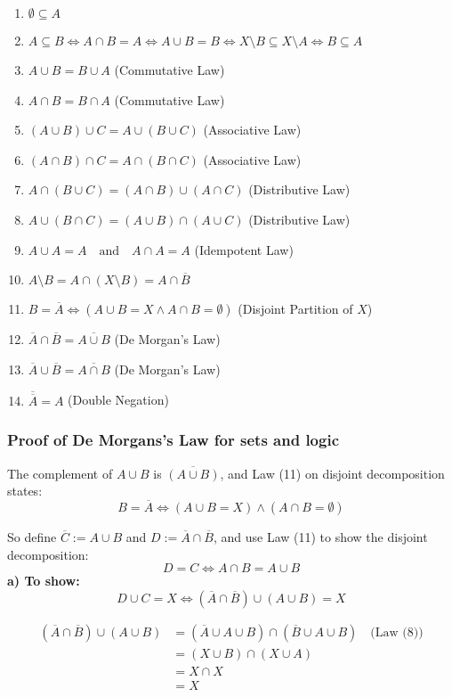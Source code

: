 \begin{enumerate}
    \item $\emptyset \subseteq A$
    \item $A \subseteq B \iff A \cap B = A \iff A \cup B = B \iff X \setminus B \subseteq X \setminus A \iff B \subseteq A$
    \item $A \cup B = B \cup A$ \hfill (Commutative Law)
    \item $A \cap B = B \cap A$ \hfill (Commutative Law)
    \item $(A \cup B) \cup C = A \cup (B \cup C)$ \hfill (Associative Law)
    \item $(A \cap B) \cap C = A \cap (B \cap C)$ \hfill (Associative Law)
    \item $A \cap (B \cup C) = (A \cap B) \cup (A \cap C)$ \hfill (Distributive Law)
    \item $A \cup (B \cap C) = (A \cup B) \cap (A \cup C)$ \hfill (Distributive Law)
    \item $A \cup A = A \quad \text{and} \quad A \cap A = A$ \hfill (Idempotent Law)
    \item $A \setminus B = A \cap (X \setminus B) = A \cap \overline{B}$
    \item $B = \overline{A} \iff (A \cup B = X \land A \cap B = \emptyset)$ \hfill (Disjoint Partition of $X$)
    \item $\overline{A} \cap \overline{B} = \overline{A \cup B}$ \hfill (De Morgan's Law)
    \item $\overline{A} \cup \overline{B} = \overline{A \cap B}$ \hfill (De Morgan's Law)
    \item $\overline{\overline{A}} = A$ \hfill (Double Negation)
\end{enumerate}

\subsubsection{Proof of De Morgans's Law for sets and logic}
The complement of \( A \cup B \) is \( \overline{(A \cup B)} \), and Law (11) on disjoint decomposition states:
\[
B = \overline{A} \iff (A \cup B = X) \land (A \cap B = \emptyset)
\]

So define \( \overline{C} := A \cup B \) and \( D := \overline{A} \cap \overline{B} \),  
and use Law (11) to show the disjoint decomposition:
\[
D = C \iff A \cap B = A \cup B
\]
\smallskip
\textbf{a) To show:} 
\[
D \cup C = X \iff (\overline{A} \cap \overline{B}) \cup (A \cup B) = X
\]

\begin{align*}
(\overline{A} \cap \overline{B}) \cup (A \cup B) 
&= (\overline{A} \cup A \cup B) \cap (\overline{B} \cup A \cup B) \quad \text{(Law (8))} \\
&= (X \cup B) \cap (X \cup A) \\
&= X \cap X \\
&= X
\end{align*}

